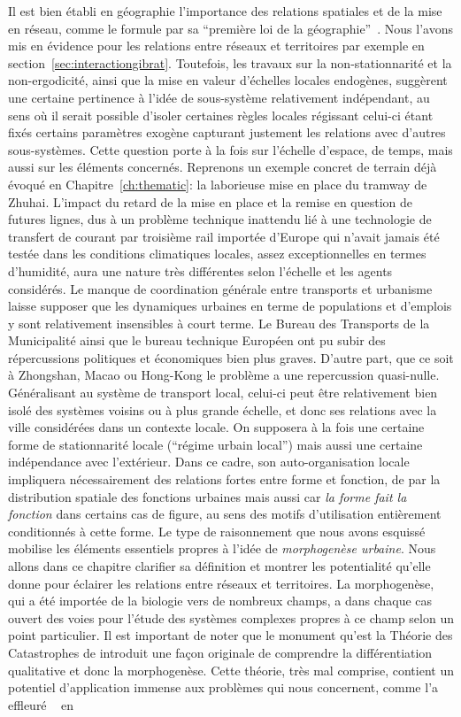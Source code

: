 Il est bien établi en géographie l'importance des relations spatiales et de la mise en réseau, comme le formule  par sa ``première loi de la géographie''~\cite{tobler2004first}. Nous l'avons mis en évidence pour les relations entre réseaux et territoires par exemple en section~\ref{sec:interactiongibrat}. Toutefois, les travaux sur la non-stationnarité et la non-ergodicité, ainsi que la mise en valeur d'échelles locales endogènes, suggèrent une certaine pertinence à l'idée de sous-système relativement indépendant, au sens où il serait possible d'isoler certaines règles locales régissant celui-ci étant fixés certains paramètres exogène capturant justement les relations avec d'autres sous-systèmes. Cette question porte à la fois sur l'échelle d'espace, de temps, mais aussi sur les éléments concernés. Reprenons un exemple concret de terrain déjà évoqué en Chapitre~\ref{ch:thematic}: la laborieuse mise en place du tramway de Zhuhai. L'impact du retard de la mise en place et la remise en question de futures lignes, dus à un problème technique inattendu lié à une technologie de transfert de courant par troisième rail importée d'Europe qui n'avait jamais été testée dans les conditions climatiques locales, assez exceptionnelles en termes d'humidité, aura une nature très différentes selon l'échelle et les agents considérés. Le manque de coordination générale entre transports et urbanisme laisse supposer que les dynamiques urbaines en terme de populations et d'emplois y sont relativement insensibles à court terme. Le Bureau des Transports de la Municipalité ainsi que le bureau technique Européen ont pu subir des répercussions politiques et économiques bien plus graves. D'autre part, que ce soit à Zhongshan, Macao ou Hong-Kong le problème a une repercussion quasi-nulle. Généralisant au système de transport local, celui-ci peut être relativement bien isolé des systèmes voisins ou à plus grande échelle, et donc ses relations avec la ville considérées dans un contexte locale. On supposera à la fois une certaine forme de stationnarité locale (``régime urbain local'') mais aussi une certaine indépendance avec l'extérieur. Dans ce cadre, son auto-organisation locale impliquera nécessairement des relations fortes entre forme et fonction, de par la distribution spatiale des fonctions urbaines mais aussi car \emph{la forme fait la fonction} dans certains cas de figure, au sens des motifs d'utilisation entièrement conditionnés à cette forme. Le type de raisonnement que nous avons esquissé mobilise les éléments essentiels propres à l'idée de \emph{morphogenèse urbaine}. Nous allons dans ce chapitre clarifier sa définition et montrer les potentialité qu'elle donne pour éclairer les relations entre réseaux et territoires. La morphogenèse, qui a été importée de la biologie vers de nombreux champs, a dans chaque cas ouvert des voies pour l'étude des systèmes complexes propres à ce champ selon un point particulier. Il est important de noter que le monument qu'est la Théorie des Catastrophes de  introduit une façon originale de comprendre la différentiation qualitative et donc la morphogenèse. Cette théorie, très mal comprise, contient un potentiel d'application immense aux problèmes qui nous concernent, comme l'a effleuré ~\cite{durand2003geographes} en 